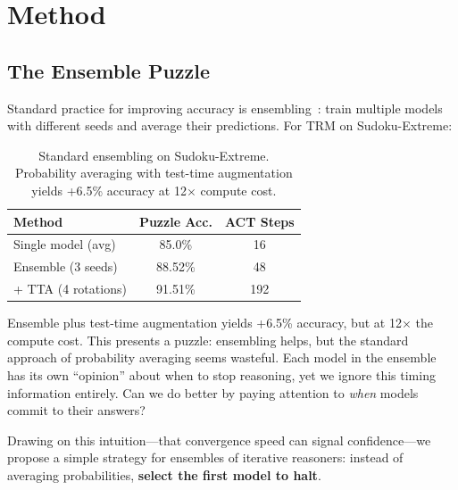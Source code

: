 \section{Method}

\subsection{The Ensemble Puzzle}

Standard practice for improving accuracy is
ensembling~\citep{dietterich2000ensemble}: train multiple models with different
seeds and average their predictions. For TRM on Sudoku-Extreme:
%
\begin{table}[h]
\centering
\begin{tabular}{lcc}
\toprule
Method & Puzzle Acc. & ACT Steps \\
\midrule
Single model (avg) & 85.0\% & 16 \\  %
Ensemble (3 seeds) & 88.52\% & 48 \\  %
+ TTA (4 rotations) & 91.51\% & 192 \\  %
\bottomrule
\end{tabular}
\caption{Standard ensembling on Sudoku-Extreme. Probability averaging with
test-time augmentation yields +6.5\% accuracy at 12$\times$ compute cost.}
\label{tab:ensemble-puzzle}
\end{table}
%
Ensemble plus test-time augmentation yields +6.5\% accuracy, but at
12$\times$ the compute cost. This presents a puzzle: ensembling helps, but the
standard approach of probability averaging seems wasteful. Each model in the
ensemble has its own ``opinion'' about when to stop reasoning, yet we ignore
this timing information entirely. Can we do better by paying attention to
\emph{when} models commit to their answers?

Drawing on this intuition---that convergence speed can signal
confidence---we propose a simple strategy for ensembles of iterative
reasoners: instead of averaging probabilities, \textbf{select the first model
to halt}.


